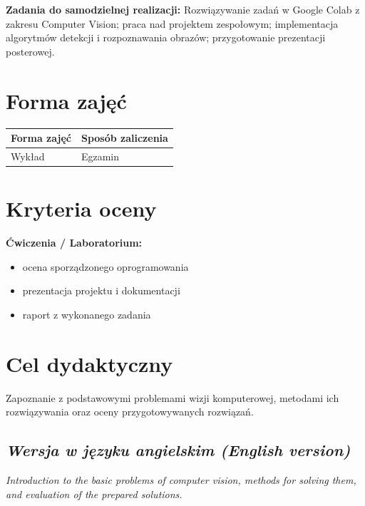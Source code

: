 \documentclass[12pt, a4paper]{article}
\newcommand{\thdrule}{\noalign{\global\setlength{\extrarowheight}{0pt}}}
\newcommand{\thdend}{\noalign{\global\setlength{\extrarowheight}{3pt}}}
\begin{document}
\vspace{4pt}
\noindent\textbf{Zadania do samodzielnej realizacji:} Rozwiązywanie zadań w Google Colab z zakresu Computer Vision; praca nad projektem zespołowym; implementacja algorytmów detekcji i rozpoznawania obrazów; przygotowanie prezentacji posterowej.

\section{Forma zajęć}

\begin{center}
{\scriptsize
\begin{tabular}{m{5cm}m{8cm}}
\thdrule\toprule
\rowcolor{pjatkRed} {\color{white}\textbf{Forma zajęć}} & {\color{white}\textbf{Sposób zaliczenia}} \\
\midrule\thdend
  \rowcolor{tableRowLight} Wykład & Egzamin \\
\bottomrule
\end{tabular}}
\end{center}

\section{Kryteria oceny}

\textbf{Ćwiczenia / Laboratorium:}
\begin{itemize}
  \item ocena sporządzonego oprogramowania
  \item prezentacja projektu i dokumentacji
  \item raport z wykonanego zadania
\end{itemize}


\section{Cel dydaktyczny}

Zapoznanie z podstawowymi problemami wizji komputerowej, metodami ich rozwiązywania oraz oceny przygotowywanych rozwiązań.

\subsection*{\textit{Wersja w języku angielskim (English version)}}

\textit{Introduction to the basic problems of computer vision, methods for solving them, and evaluation of the prepared solutions.}
\end{document}
